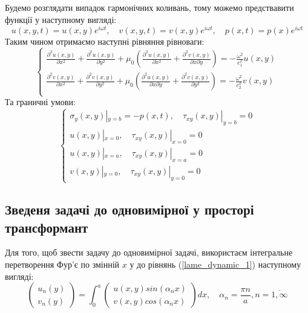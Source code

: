 Будемо розглядати випадок гармонічних коливань, тому можемо предствавити функції у наступному вигляді:
\begin{equation}
    u(x,y,t) = u(x,y) e^{i \omega t}, \quad v(x,y,t) = v(x,y) e^{i \omega t}, \quad p(x,t) = p(x) e^{i \omega t}
\end{equation}
Таким чином отримаємо наступні рівняння рівноваги:
\begin{equation}\label{lame_dynamic_1}
    \begin{cases}
        \frac{\partial^2 u(x,y)}{\partial x^2} + \frac{\partial^2 u(x,y)}{\partial y^2} + \mu_0 (\frac{\partial^2 u(x,y)}{\partial x^2} + \frac{\partial^2 v(x,y)}{\partial x\partial y}) = -\frac{\omega^2}{c_1^2}  u(x,y) \\
        \frac{\partial^2 v(x,y)}{\partial x^2} + \frac{\partial^2 v(x,y)}{\partial y^2} + \mu_0 (\frac{\partial^2 u(x,y)}{\partial x \partial y} + \frac{\partial^2 v(x,y)}{\partial y^2}) = -\frac{\omega^2}{c_2^2} v(x,y) \\
    \end{cases}
\end{equation}
Та граничні умови:
\begin{equation}\label{bound_dynamic_1}
    \begin{cases}
        \sigma_y(x, y) |_{y=b} = -p(x, t), \quad  \tau_{xy}(x,y) |_{y=b} =0 \\
        u(x,y) |_{x=0}, \quad \tau_{xy}(x,y) |_{x=0} =0 \\
        u(x,y) |_{x=a}, \quad \tau_{xy}(x,y) |_{x=a} =0 \\
        v(x,y) |_{y=0}, \quad \tau_{xy}(x,y) |_{y=0} =0
    \end{cases}
\end{equation}

\subsection{Зведеня задачі до одновимірної у просторі трансформант}
Для того, щоб звести задачу до одновимірної задачі, використаєм інтегральне перетворення Фур'є по змінній $x$ у до рівнянь (\ref{lame_dynamic_1}) наступному вигляді:
\begin{equation}
    \begin{pmatrix}
        u_n(y) \\
        v_n(y)
    \end{pmatrix} = \int_{0}^{a} 
    \begin{pmatrix}
        u(x,y) sin(\alpha_n x) \\
        v(x,y) cos(\alpha_n x)
    \end{pmatrix} dx, \quad \alpha_n = \frac{\pi n}{a}, n=\overline{1, \infty}
\end{equation}

